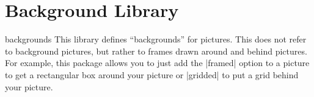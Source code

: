 %
%
%


\section{Background Library}
\label{section-tikz-backgrounds}

\begin{tikzlibrary}{backgrounds}
    This library defines ``backgrounds'' for pictures. This does not refer to
    background pictures, but rather to frames drawn around and behind pictures.
    For example, this package allows you to just add the |framed| option to a
    picture to get a rectangular box around your picture or |gridded| to put a
    grid behind your picture.
\end{tikzlibrary}

